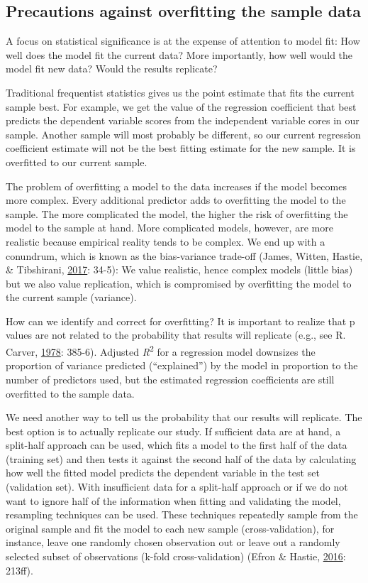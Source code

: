 \documentclass[doc]{apa6}
\begin{document}
\subsection{Precautions against overfitting the sample
data}\label{precautions-against-overfitting-the-sample-data}

A focus on statistical significance is at the expense of attention to
model fit: How well does the model fit the current data? More
importantly, how well would the model fit new data? Would the results
replicate?

Traditional frequentist statistics gives us the point estimate that fits
the current sample best. For example, we get the value of the regression
coefficient that best predicts the dependent variable scores from the
independent variable cores in our sample. Another sample will most
probably be different, so our current regression coefficient estimate
will not be the best fitting estimate for the new sample. It is
overfitted to our current sample.

The problem of overfitting a model to the data increases if the model
becomes more complex. Every additional predictor adds to overfitting the
model to the sample. The more complicated the model, the higher the risk
of overfitting the model to the sample at hand. More complicated models,
however, are more realistic because empirical reality tends to be
complex. We end up with a conundrum, which is known as the bias-variance
trade-off (James, Witten, Hastie, \& Tibshirani,
\protect\hyperlink{ref-JamesIntroductionStatisticalLearning2017}{2017}:
34-5): We value realistic, hence complex models (little bias) but we
also value replication, which is compromised by overfitting the model to
the current sample (variance).

How can we identify and correct for overfitting? It is important to
realize that p values are not related to the probability that results
will replicate (e.g., see R. Carver,
\protect\hyperlink{ref-carverCaseStatisticalSignificance1978}{1978}:
385-6). Adjusted \emph{R}\textsuperscript{2} for a regression model
downsizes the proportion of variance predicted (\enquote{explained}) by
the model in proportion to the number of predictors used, but the
estimated regression coefficients are still overfitted to the sample
data.

We need another way to tell us the probability that our results will
replicate. The best option is to actually replicate our study. If
sufficient data are at hand, a split-half approach can be used, which
fits a model to the first half of the data (training set) and then tests
it against the second half of the data by calculating how well the
fitted model predicts the dependent variable in the test set (validation
set). With insufficient data for a split-half approach or if we do not
want to ignore half of the information when fitting and validating the
model, resampling techniques can be used. These techniques repeatedly
sample from the original sample and fit the model to each new sample
(cross-validation), for instance, leave one randomly chosen observation
out or leave out a randomly selected subset of observations (k-fold
cross-validation) (Efron \& Hastie,
\protect\hyperlink{ref-efronComputerAgeStatistical2016}{2016}: 213ff).
\end{document}
